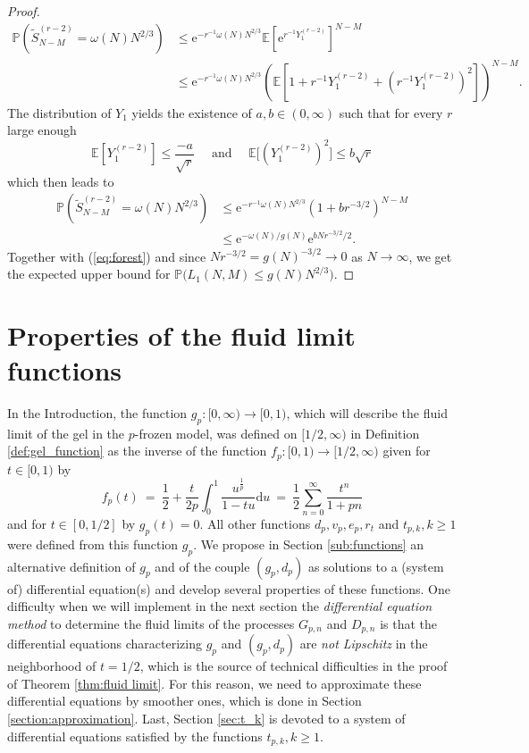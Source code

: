 \documentclass[a4, 11pt]{article}
\numberwithin{equation}{section}
\theoremstyle{plain}
\theoremstyle{definition}
\theoremstyle{remark}
\begin{document}
\begin{proof}
\begin{align*}
\mathbb{P}\left(\tilde{S}_{N-M}^{(r-2)}=\omega(N)N^{2/3}\right)&\leq \mathrm{e}^{-r^{-1} \omega(N)N^{2/3}}\mathbb{E}\left[\mathrm{e}^{r^{-1} Y_1^{(r-2)}} \right]^{N-M}\\
&\leq  \mathrm{e}^{-r^{-1} \omega(N)N^{2/3}}\left(\mathbb{E}\left[1+r^{-1} Y_1^{(r-2)}+\left(r^{-1} Y_1^{(r-2)}\right)^2\right]\right)^{N-M}.
\end{align*}
The distribution of $Y_1$ yields the existence of $a,b \in (0,\infty)$ such that for every $r$ large enough
$$\mathbb{E}\left[Y_1^{(r-2)}\right]\leq \frac{-a}{\sqrt{r}} \quad \text{ and }\quad \mathbb{E}\Big[\left(Y_1^{(r-2)}\right)^2\Big]\leq b\sqrt{r}$$ 
which then leads to
\begin{align*}
	\mathbb{P}\left(\tilde{S}_{N-M}^{(r-2)}=\omega(N)N^{2/3}\right)&\leq \mathrm{e}^{-r^{-1} \omega(N)N^{2/3}}\left(1+br^{-3/2}\right)^{N-M}\\
	&\leq \mathrm{e}^{-\omega(N)/g(N)}\mathrm{e}^{bNr^{-3/2}/2}.
\end{align*}
Together with (\ref{eq:forest}) and since $N r^{-3/2}=g(N)^{-3/2}\to 0$ as $N\to \infty$, we get the expected upper bound for $\mathbb{P}\big(L_1(N,M)\leq g(N)N^{2/3}\big)$.
\end{proof}

  
\section{Properties of the fluid limit functions}
\label{sec:fluid}

In the Introduction, the function $g_p:[0,\infty)\rightarrow [0,1)$, which will describe the fluid limit of the gel in the $p$-frozen model, was defined on $ [1/2,\infty)$ in Definition \ref{def:gel_function} as the inverse of the function $f_p:[0,1) \rightarrow [1/2,\infty)$ given for $t \in [0,1)$ by
\begin{equation}
\label{def:f_p}
f_p(t)~=~\frac{1}{2}+\frac{t}{2p}\int_{0}^1 \frac{u^{\frac{1}{p}}}{1-tu} \mathrm du~=~\frac{1}{2}\sum_{n=0}^{\infty}\frac{t^n}{1+pn}
\end{equation}
and for $t \in [0,1/2]$ by $g_p(t)=0$. All other functions $d_p,v_p,e_p,r_t$ and $t_{p,k},k\geq 1$ were defined from this function $g_p$. We propose in Section \ref{sub:functions} an alternative definition of $g_p$ and of the couple $(g_p,d_p)$ as solutions to a (system of) differential equation(s) and develop several properties of these functions. One difficulty when we will implement in the next section the \emph{differential equation method}  to determine the fluid limits of the processes $G_{p,n}$ and $D_{p,n}$ is that the differential equations characterizing $g_p$ and $(g_p,d_p)$ are \emph{not Lipschitz} in the neighborhood of $t=1/2$, which is the source of technical difficulties in the proof of Theorem \ref{thm:fluid limit}. For this reason, we need to approximate these differential equations by smoother ones, which is done in Section \ref{section:approximation}.  Last, Section \ref{sec:t_k} is devoted to a system of differential equations satisfied by the functions $t_{p,k},k\geq 1$.
\end{document}
